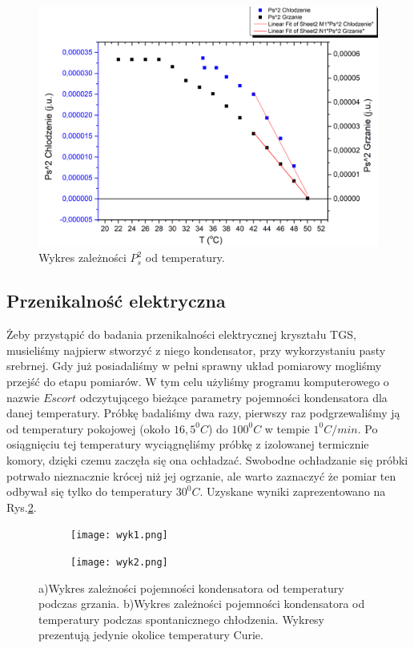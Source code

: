 \documentclass{article}
\begin{document}
\begin{figure}[!h]
	\centering
	\includegraphics[width=0.8\linewidth]{Graph30.png}
	\caption{Wykres zależności $P_{s}^{2}$ od temperatury.}
	\label{fig:Graph30}
\end{figure}

\newpage
\subsection{Przenikalność elektryczna}
Żeby przystąpić do badania przenikalności elektrycznej kryształu TGS, musieliśmy najpierw stworzyć z niego kondensator, przy wykorzystaniu pasty srebrnej. Gdy już posiadaliśmy w pełni sprawny układ pomiarowy mogliśmy przejść do etapu pomiarów. W tym celu użyliśmy programu komputerowego o nazwie $Escort$ odczytującego bieżące parametry pojemności kondensatora dla danej temperatury. Próbkę badaliśmy dwa razy, pierwszy raz podgrzewaliśmy ją od temperatury pokojowej (około $16,5^{0}C$) do $100^{0}C$ w tempie $1^{0}C/min$. Po osiągnięciu tej temperatury wyciągnęliśmy próbkę z izolowanej termicznie komory, dzięki czemu zaczęła się ona ochładzać. Swobodne ochładzanie się próbki potrwało nieznacznie krócej niż jej ogrzanie, ale warto zaznaczyć że pomiar ten odbywał się tylko do temperatury $30^{0}C$. Uzyskane wyniki zaprezentowano na Rys.\ref{fig:wyk12}.

\begin{figure}[h!]
  \centering
  \begin{subfigure}[b]{0.49\linewidth}
    \texttt{[image: wyk1.png]}
    \caption{}
  \end{subfigure}
  \begin{subfigure}[b]{0.49\linewidth}
    \texttt{[image: wyk2.png]}
    \caption{}
  \end{subfigure}
  \caption{a)Wykres zależności pojemności kondensatora od temperatury podczas grzania. b)Wykres zależności pojemności kondensatora od temperatury podczas spontanicznego chłodzenia. Wykresy prezentują jedynie okolice temperatury Curie.}
  \label{fig:wyk12}
\end{figure}
\end{document}
